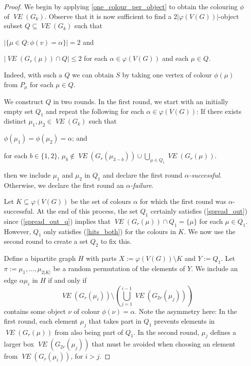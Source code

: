 \documentclass{patmorin}
\newcommand{\defin}[1]{\emph{\color{brown}#1}}
\DeclareMathOperator{\VE}{\mathit{VE}}
\begin{document}
\begin{proof}
  We begin by applying \cref{one_colour_per_object} to obtain the colouring $\phi$ of $\VE(G_k)$.  Observe that it is now sufficient to find a $2|\varphi(V(G))|$-object subset $Q\subseteq\VE(G_k)$ such that
  \begin{compactenum}[(i)]
    \item $|\{\mu\in Q:\phi(v)=\alpha\}|= 2$ and
    \item $|\VE(G_r(\mu))\cap Q|\le 2$ for each $\alpha\in\varphi(V(G))$ and each $\mu\in Q$.
  \end{compactenum}
  Indeed, with such a $Q$ we can obtain $S$ by taking one vertex of colour $\phi(\mu)$ from $P_\mu$ for each $\mu\in Q$.

  We construct $Q$ in two rounds.  In the first round, we start with an initially empty set $Q_1$ and repeat the following for each $\alpha\in\varphi(V(G))$:
  If there exists distinct $\mu_1,\mu_2\in\VE(G_k)$ such that
  \begin{compactenum}[(a)]
    \item $\phi(\mu_1)=\phi(\mu_2)=\alpha$; and\label{hits_both_q}
    \item for each $b\in\{1,2\}$, $\mu_b\not\in \VE(G_r(\mu_{3-b})) \cup \bigcup_{\mu\in Q_1} \VE(G_r(\mu))$.\label{spread_out_q}
  \end{compactenum}
  then we include $\mu_1$ and $\mu_2$ in $Q_1$ and declare the first round \defin{$\alpha$-successful}.  Otherwise, we declare the first round an \defin{$\alpha$-failure}.

  Let $K\subseteq\varphi(V(G))$ be the set of colours $\alpha$ for which the first round was $\alpha$-successful. At the end of this process, the set $Q_1$ certainly satisfies (\ref{spread_out}) since (\ref{spread_out_q}) implies that $\VE(G_r(\mu))\cap Q_1=\{\mu\}$ for each $\mu\in Q_1$.  However, $Q_1$ only satisfies (\ref{hits_both}) for the colours in $K$.  We now use the second round to create a set $Q_2$ to fix this.

  Define a bipartite graph $H$ with parts $X:=\varphi(V(G))\setminus K$ and $Y:=Q_1$.  Let $\pi:=\mu_1,\ldots,\mu_{2|K|}$ be a random permutation of the elements of $Y$.  We include an edge $\alpha\mu_i$ in $H$ if and only if
  \[
    \VE(G_r(\mu_i))\setminus\left(\bigcup_{j=1}^{i-1}\VE(G_{2r}(\mu_j))\right)
  \]
  contains some object $\nu$ of colour $\phi(\nu)=\alpha$.  Note the asymmetry here: In the first round, each element $\mu_j$ that takes part in $Q_1$ prevents elements in $\VE(G_r(\mu))$ from also being part of $Q_1$.  In the second round, $\mu_j$ defines a larger box $\VE(G_{2r}(\mu_j))$ that must be avoided when choosing an element from $\VE(G_r(\mu_i))$, for $i>j$.


\end{proof}
\end{document}
